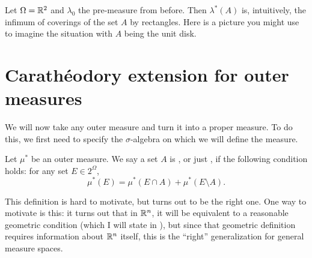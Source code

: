 \begin{example}
	Let $\Omega = \mathbb R^2$ and $\lambda_0$ the pre-measure from before.
	Then $\lambda^\ast(A)$ is, intuitively,
	the infimum of coverings of the set $A$ by rectangles.
	Here is a picture you might use to imagine the
	situation with $A$ being the unit disk.
\end{example}



\section{Carath\'{e}odory extension for outer measures}
We will now take any outer measure and turn it into a proper measure.
To do this, we first need to specify the $\sigma$-algebra
on which we will define the measure.

\begin{definition}
	Let $\mu^\ast$ be an outer measure.
	We say a set $A$ is , or just ,
	if the following condition holds:
	for any set $E \in 2^{\Omega}$,
	\[ \mu^\ast(E) = \mu^\ast(E \cap A) + \mu^\ast(E \setminus A). \]
\end{definition}
This definition is hard to motivate, but turns out to be the right one.
One way to motivate is this:
it turns out that in $\mathbb R^n$,
it will be equivalent to a reasonable geometric condition
(which I will state in ),
but since that geometric definition requires information about $\mathbb R^n$ itself,
this is the ``right'' generalization for general measure spaces.

